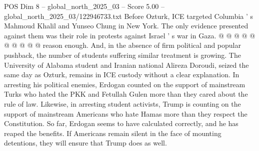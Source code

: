 \begin{textsample}{POS Dim 8 – global\_north\_2025\_03 – Score 5.00 – global\_north\_2025\_03/122946733.txt}
Before Ozturk, ICE targeted Columbia ' s Mahmoud Khalil and Yunseo Chung in New York.
The only evidence presented against them was their role in protests against Israel ' s war in Gaza. @ @ @ @ @ @ @ @ @ @ reason enough.
And, in the absence of firm political and popular pushback, the number of students suffering similar treatment is growing.
The University of Alabama student and Iranian national Alireza Doroudi, seized the same day as Ozturk, remains in ICE custody without a clear explanation.
In arresting his political enemies, Erdogan counted on the support of mainstream Turks who hated the PKK and Fetullah Gulen more than they cared about the rule of law.
Likewise, in arresting student activists, Trump is counting on the support of mainstream Americans who hate Hamas more than they respect the Constitution.
So far, Erdogan seems to have calculated correctly, and he has reaped the benefits.
If Americans remain silent in the face of mounting detentions, they will ensure that Trump does as well.

\end{textsample}
